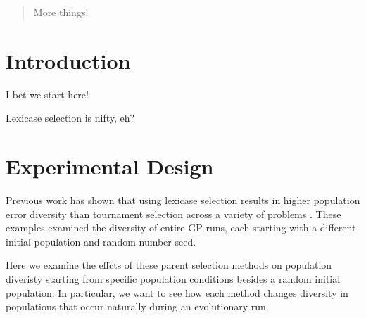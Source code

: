 \documentclass{sig-alternate-05-2015}
\begin{document}
\maketitle
\begin{abstract}
More things!
\end{abstract}

%
%
\printccsdesc



\section{Introduction}
\label{sec:introduction}

I bet we start here!

Lexicase selection \cite{Spector:2012:GECCOcompANEW} is nifty, eh?

\section{Experimental Design}

Previous work has shown that using lexicase selection results in higher population error diversity than tournament selection across a variety of problems \cite{Helmuth:2015:GPTP, Helmuth:2015:ieeeTEC}. These examples examined the diversity of entire GP runs, each starting with a different initial population and random number seed.

Here we examine the effcts of these parent selection methods on population diveristy starting from specific population conditions besides a random initial population. In particular, we want to see how each method changes diversity in populations that occur naturally during an evolutionary run.
\end{document}
